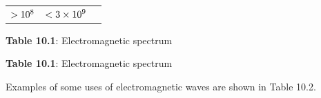 \begin{table}[H]
\begin{center}
\begin{xtabular}[t]{|l|l|l|}
                $>{}{10}^{8}$
               &
                $<{}3\times{10}^{9}$
     \tabularnewline{}
    \end{xtabular}
      \end{center}
    \begin{center}{\small\bfseries Table 10.1}: Electromagnetic spectrum\end{center}
    \begin{caption}{\small\bfseries Table 10.1}: Electromagnetic spectrum\end{caption}
\end{table}
    \par
      \label{m38778*id188548}Examples of some uses of electromagnetic waves are shown in Table 10.2.\par 

